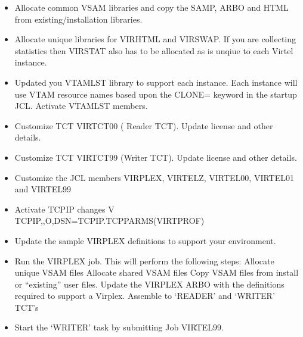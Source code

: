 \documentclass[letterpaper,10pt,english]{sphinxmanual}
\begin{document}
\begin{sphinxVerbatim}[commandchars=\\\{\}]
            
\end{sphinxVerbatim}
\begin{itemize}
\item {} 
\sphinxAtStartPar
Allocate common VSAM libraries and copy the SAMP, ARBO and HTML from existing/installation libraries.

\item {} 
\sphinxAtStartPar
Allocate unique libraries for VIRHTML and VIRSWAP. If you are collecting statistics then VIRSTAT also has to be allocated as is unqiue to each Virtel instance.

\item {} 
\sphinxAtStartPar
Updated you VTAMLST library to support each instance. Each instance will use VTAM resource names based upon the CLONE= keyword in the startup JCL. Activate VTAMLST members.

\item {} 
\sphinxAtStartPar
Customize TCT VIRTCT00 ( Reader TCT). Update license and other details.

\item {} 
\sphinxAtStartPar
Customize TCT VIRTCT99 (Writer TCT). Update license and other details.

\item {} 
\sphinxAtStartPar
Customize the JCL members VIRPLEX, VIRTELZ, VIRTEL00, VIRTEL01 and VIRTEL99

\item {} 
\sphinxAtStartPar
Activate TCPIP changes \textendash{} V TCPIP,,O,DSN=TCPIP.TCPPARMS(VIRTPROF)

\item {} 
\sphinxAtStartPar
Update the sample VIRPLEX definitions to support your environment.

\item {} 
\sphinxAtStartPar
Run the VIRPLEX job. This will perform the following steps:\sphinxhyphen{}
Allocate unique VSAM files
Allocate shared VSAM files
Copy VSAM files from install or “existing” user files.
Update the VIRPLEX ARBO with the definitions required to support a Virplex.
Assemble to ‘READER’ and ‘WRITER’ TCT’s

\item {} 
\sphinxAtStartPar
Start the ‘WRITER’ task by submitting Job VIRTEL99.

\end{itemize}
\end{document}
